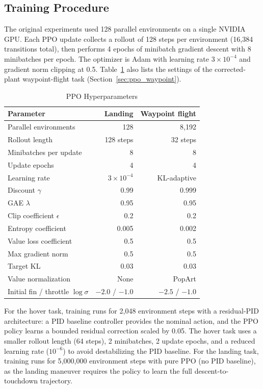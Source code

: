 \documentclass[conference]{IEEEtran}
\begin{document}
\subsection{Training Procedure}

The original experiments used 128 parallel environments on a single NVIDIA GPU. Each PPO update collects a rollout of 128 steps per environment (16{,}384 transitions total), then performs 4 epochs of minibatch gradient descent with 8 minibatches per epoch. The optimizer is Adam with learning rate $3 \times 10^{-4}$ and gradient norm clipping at 0.5. Table~\ref{tab:ppo_params} also lists the settings of the corrected-plant waypoint-flight task (Section~\ref{sec:ppo_waypoint}).

\begin{table}[htbp]
\caption{PPO Hyperparameters}
\label{tab:ppo_params}
\centering
\begin{tabular}{lrr}
\toprule
\textbf{Parameter} & \textbf{Landing} & \textbf{Waypoint flight} \\
\midrule
Parallel environments & 128 & 8{,}192 \\
Rollout length & 128 steps & 32 steps \\
Minibatches per update & 8 & 8 \\
Update epochs & 4 & 4 \\
Learning rate & $3 \times 10^{-4}$ & KL-adaptive \\
Discount $\gamma$ & 0.99 & 0.999 \\
GAE $\lambda$ & 0.95 & 0.95 \\
Clip coefficient $\epsilon$ & 0.2 & 0.2 \\
Entropy coefficient & 0.005 & 0.002 \\
Value loss coefficient & 0.5 & 0.5 \\
Max gradient norm & 0.5 & 0.5 \\
Target KL & 0.03 & 0.03 \\
Value normalization & None & PopArt \\
Initial fin / throttle $\log\sigma$ & $-2.0$ / $-1.0$ & $-2.5$ / $-1.0$ \\
\bottomrule
\end{tabular}
\end{table}

For the hover task, training runs for 2{,}048 environment steps with a residual-PID architecture: a PID baseline controller provides the nominal action, and the PPO policy learns a bounded residual correction scaled by 0.05. The hover task uses a smaller rollout length (64 steps), 2 minibatches, 2 update epochs, and a reduced learning rate ($10^{-6}$) to avoid destabilizing the PID baseline. For the landing task, training runs for 5{,}000{,}000 environment steps with pure PPO (no PID baseline), as the landing maneuver requires the policy to learn the full descent-to-touchdown trajectory.
\end{document}
